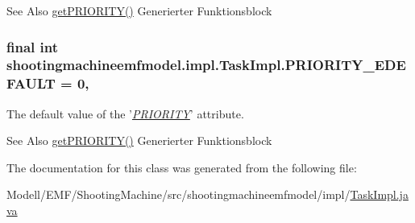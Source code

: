 \begin{DoxySeeAlso}{See Also}
\hyperlink{classshootingmachineemfmodel_1_1impl_1_1_task_impl_afbc32e6264af20e59fee3c02b3a192fb}{get\-P\-R\-I\-O\-R\-I\-T\-Y()} Generierter Funktionsblock  
\end{DoxySeeAlso}
\hypertarget{classshootingmachineemfmodel_1_1impl_1_1_task_impl_af278a531c9292c228130ebdf1638301a}{
\subsubsection[{P\-R\-I\-O\-R\-I\-T\-Y\-\_\-\-E\-D\-E\-F\-A\-U\-L\-T}]{\setlength{\rightskip}{0pt plus 5cm}final int shootingmachineemfmodel.\-impl.\-Task\-Impl.\-P\-R\-I\-O\-R\-I\-T\-Y\-\_\-\-E\-D\-E\-F\-A\-U\-L\-T = 0\hspace{0.3cm}{\ttfamily [static]}, {\ttfamily [protected]}}}\label{classshootingmachineemfmodel_1_1impl_1_1_task_impl_af278a531c9292c228130ebdf1638301a}
The default value of the '\hyperlink{classshootingmachineemfmodel_1_1impl_1_1_task_impl_afbc32e6264af20e59fee3c02b3a192fb}{{\itshape P\-R\-I\-O\-R\-I\-T\-Y}}' attribute.

\begin{DoxySeeAlso}{See Also}
\hyperlink{classshootingmachineemfmodel_1_1impl_1_1_task_impl_afbc32e6264af20e59fee3c02b3a192fb}{get\-P\-R\-I\-O\-R\-I\-T\-Y()} Generierter Funktionsblock  
\end{DoxySeeAlso}


The documentation for this class was generated from the following file\-:\begin{DoxyCompactItemize}
\item 
Modell/\-E\-M\-F/\-Shooting\-Machine/src/shootingmachineemfmodel/impl/\hyperlink{_task_impl_8java}{Task\-Impl.\-java}\end{DoxyCompactItemize}
